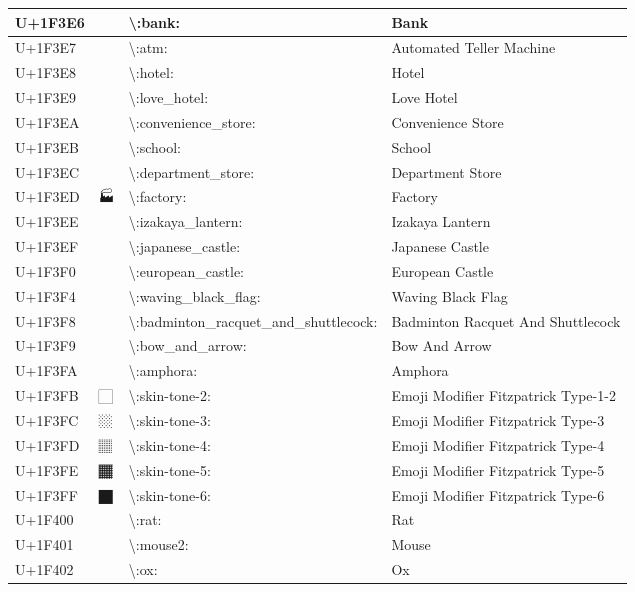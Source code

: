 \begin{table}[h]
\begin{tabulary}{\linewidth}{|L|L|L|L|}
\hline
U+1F3E6 & 🏦 & {\textbackslash}:bank: & Bank \\
\hline
U+1F3E7 & 🏧 & {\textbackslash}:atm: & Automated Teller Machine \\
\hline
U+1F3E8 & 🏨 & {\textbackslash}:hotel: & Hotel \\
\hline
U+1F3E9 & 🏩 & {\textbackslash}:love\_hotel: & Love Hotel \\
\hline
U+1F3EA & 🏪 & {\textbackslash}:convenience\_store: & Convenience Store \\
\hline
U+1F3EB & 🏫 & {\textbackslash}:school: & School \\
\hline
U+1F3EC & 🏬 & {\textbackslash}:department\_store: & Department Store \\
\hline
U+1F3ED & 🏭 & {\textbackslash}:factory: & Factory \\
\hline
U+1F3EE & 🏮 & {\textbackslash}:izakaya\_lantern: & Izakaya Lantern \\
\hline
U+1F3EF & 🏯 & {\textbackslash}:japanese\_castle: & Japanese Castle \\
\hline
U+1F3F0 & 🏰 & {\textbackslash}:european\_castle: & European Castle \\
\hline
U+1F3F4 & 🏴 & {\textbackslash}:waving\_black\_flag: & Waving Black Flag \\
\hline
U+1F3F8 & 🏸 & {\textbackslash}:badminton\_racquet\_and\_shuttlecock: & Badminton Racquet And Shuttlecock \\
\hline
U+1F3F9 & 🏹 & {\textbackslash}:bow\_and\_arrow: & Bow And Arrow \\
\hline
U+1F3FA & 🏺 & {\textbackslash}:amphora: & Amphora \\
\hline
U+1F3FB & 🏻 & {\textbackslash}:skin-tone-2: & Emoji Modifier Fitzpatrick Type-1-2 \\
\hline
U+1F3FC & 🏼 & {\textbackslash}:skin-tone-3: & Emoji Modifier Fitzpatrick Type-3 \\
\hline
U+1F3FD & 🏽 & {\textbackslash}:skin-tone-4: & Emoji Modifier Fitzpatrick Type-4 \\
\hline
U+1F3FE & 🏾 & {\textbackslash}:skin-tone-5: & Emoji Modifier Fitzpatrick Type-5 \\
\hline
U+1F3FF & 🏿 & {\textbackslash}:skin-tone-6: & Emoji Modifier Fitzpatrick Type-6 \\
\hline
U+1F400 & 🐀 & {\textbackslash}:rat: & Rat \\
\hline
U+1F401 & 🐁 & {\textbackslash}:mouse2: & Mouse \\
\hline
U+1F402 & 🐂 & {\textbackslash}:ox: & Ox \\

\end{tabulary}
\end{table}
